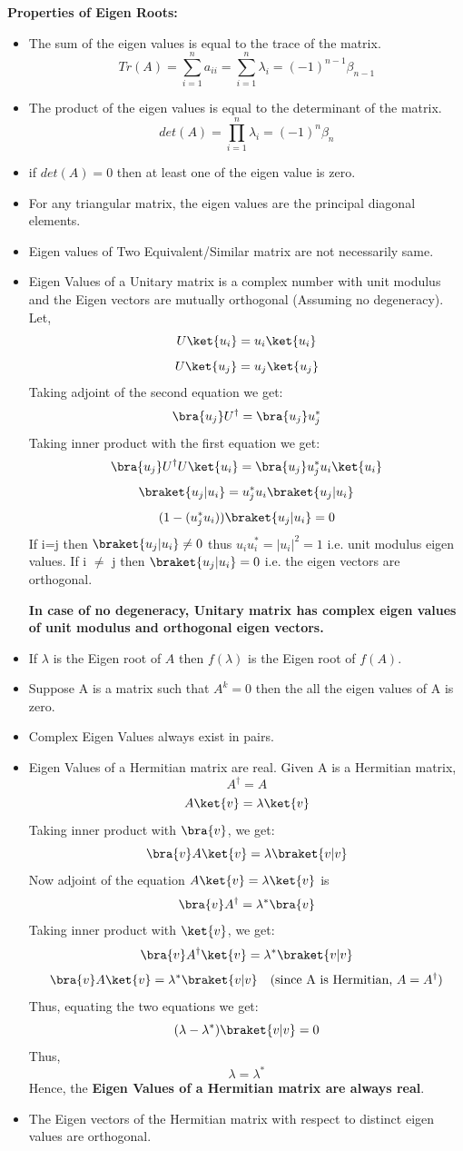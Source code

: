 \documentclass[12pt, oneside]{book}
\theoremstyle{definition}
\theoremstyle{definition}
\theoremstyle{remark}
\begin{document}
\textbf{Properties of Eigen Roots: }
\begin{itemize}
    \item The sum of the eigen values is equal to the trace of the matrix.
    \[ Tr(A)=\sum_{i=1}^n a_{ii}=\sum_{i=1}^n \lambda_i = (-1)^{n-1}\beta_{n-1} \]
    \item The product of the eigen values is equal to the determinant of the matrix.
    \[ det(A)=\prod_{i=1}^n \lambda_i = (-1)^n\beta_{n} \]
    \item if $det(A)=0$ then at least one of the eigen value is zero.
    \item For any triangular matrix, the eigen values are the principal diagonal elements.
    \item Eigen values of Two Equivalent/Similar matrix are not necessarily same.
    \item Eigen Values of a Unitary matrix is a complex number with unit modulus and the Eigen vectors are mutually orthogonal
    (Assuming no degeneracy).
    Let, 
    \[U\ket{u_i} = u_i\ket{u_i}\]
    \[U\ket{u_j} = u_j\ket{u_j}\]
    Taking adjoint of the second equation we get:
    \[ \bra{u_j}U^{\dagger}=\bra{u_j}u_j^* \]
    Taking inner product with the first equation we get:
    \[ \bra{u_j}U^{\dagger}U\ket{u_i}=\bra{u_j}u_j^*u_i\ket{u_i} \]
    \[ \braket{u_j|u_i}=u_j^*u_i \braket{u_j|u_i} \]
    \[ (1-(u_j^*u_i))\braket{u_j|u_i} = 0\]
    If i=j then $\braket{u_j|u_i} \neq 0$ thus $u_iu_i^*=|u_i|^2=1$ i.e. unit modulus eigen values. If i $\neq$ j then $\braket{u_j|u_i}=0$ i.e. the eigen vectors are orthogonal.
    
    \textbf{In case of no degeneracy, Unitary matrix has complex eigen values of unit modulus and orthogonal eigen vectors.}
    
    \item If $\lambda$ is the Eigen root of $A$ then $f(\lambda)$ is the Eigen root of $f(A)$.
    \item Suppose A is a matrix such that $A^k=0$ then the all the eigen values of A is zero.
    \item Complex Eigen Values always exist in pairs.
    \item Eigen Values of a Hermitian matrix are real.
    Given A is a Hermitian matrix,
    \[ A^{\dagger}=A \]
    \[A\ket{v}=\lambda\ket{v} \]
    Taking inner product with $\bra{v}$, we get:
    \[\bra{v}A\ket{v}=\lambda\braket{v|v} \]
    Now adjoint of the equation $A\ket{v}=\lambda\ket{v}$ is
    \[ \bra{v}A^{\dagger}=\lambda^*\bra{v} \]
    Taking inner product with $\ket{v}$, we get:
    \[ \bra{v}A^{\dagger}\ket{v}=\lambda^*\braket{v|v} \]
    \[ \bra{v}A\ket{v}=\lambda^*\braket{v|v} \quad \text{(since A is Hermitian, $A=A^{\dagger} $)}\]
    Thus, equating the two equations we get:
    \[ (\lambda - \lambda^*) \braket{v|v}=0 \]
    Thus,
    \[ \lambda=\lambda^* \]
    Hence, the \textbf{Eigen Values of a Hermitian matrix are always real}.
    \item The Eigen vectors of the Hermitian matrix with respect to distinct eigen values are orthogonal.
    

\end{itemize}
\end{document}
